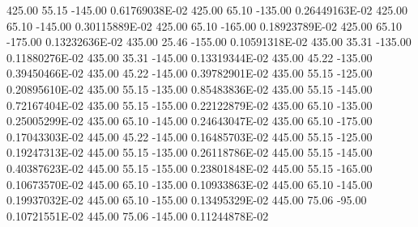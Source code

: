      425.00      55.15    -145.00      0.61769038E-02
     425.00      65.10    -135.00      0.26449163E-02
     425.00      65.10    -145.00      0.30115889E-02
     425.00      65.10    -165.00      0.18923789E-02
     425.00      65.10    -175.00      0.13232636E-02
     435.00      25.46    -155.00      0.10591318E-02
     435.00      35.31    -135.00      0.11880276E-02
     435.00      35.31    -145.00      0.13319344E-02
     435.00      45.22    -135.00      0.39450466E-02
     435.00      45.22    -145.00      0.39782901E-02
     435.00      55.15    -125.00      0.20895610E-02
     435.00      55.15    -135.00      0.85483836E-02
     435.00      55.15    -145.00      0.72167404E-02
     435.00      55.15    -155.00      0.22122879E-02
     435.00      65.10    -135.00      0.25005299E-02
     435.00      65.10    -145.00      0.24643047E-02
     435.00      65.10    -175.00      0.17043303E-02
     445.00      45.22    -145.00      0.16485703E-02
     445.00      55.15    -125.00      0.19247313E-02
     445.00      55.15    -135.00      0.26118786E-02
     445.00      55.15    -145.00      0.40387623E-02
     445.00      55.15    -155.00      0.23801848E-02
     445.00      55.15    -165.00      0.10673570E-02
     445.00      65.10    -135.00      0.10933863E-02
     445.00      65.10    -145.00      0.19937032E-02
     445.00      65.10    -155.00      0.13495329E-02
     445.00      75.06     -95.00      0.10721551E-02
     445.00      75.06    -145.00      0.11244878E-02
